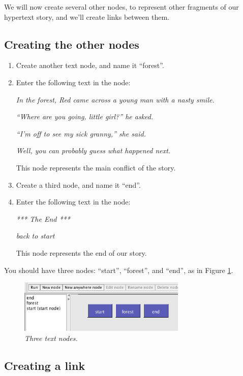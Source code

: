\documentclass{article}
\begin{document}
We will now create several other nodes, to represent other fragments of our
hypertext story, and we'll create links between them.

\subsection{Creating the other nodes}

\begin{enumerate}
  \item Create another text node, and name it ``forest''.
  \item Enter the following text in the node:

\textit{In the forest, Red came across a young man with a nasty smile.}

\textit{``Where are you going, little girl?'' he asked.}

\textit{``I'm off to see my sick granny,'' she said.}

\textit{Well, you can probably guess what happened next.}

This node represents the main conflict of the story.

\item Create a third node, and name it ``end''.
\item Enter the following text in the node:

\textit{*** The End ***}

\textit{back to start}

This node represents the end of our story.
\end{enumerate}

You should have three nodes: ``start'', ``forest'', and ``end'', as in
Figure \ref{fig:tut1:three_nodes}.

 
\begin{figure}[ht]
  \centering
  \includegraphics[width=8cm]{images/hypedyn-tutorial-1-figure-6}
  \caption{\textit{Three text nodes.}}
  \label{fig:tut1:three_nodes}
\end{figure} 

\subsection{Creating a link}
\end{document}
